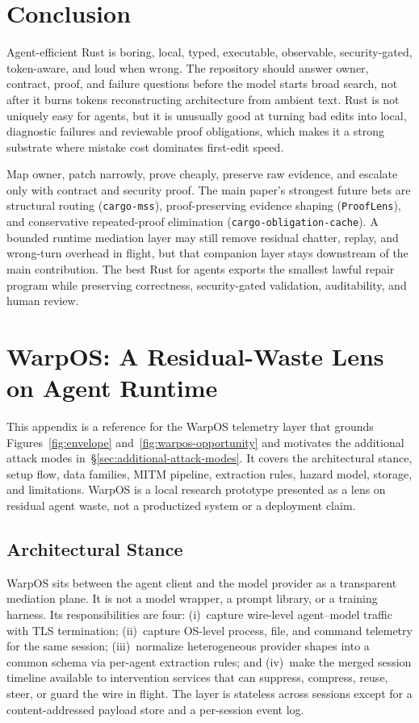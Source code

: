 \documentclass[conference]{IEEEtran}
\begin{document}
\section{Conclusion}
\label{sec:conclusion}
Agent-efficient Rust is boring, local, typed, executable, observable, security-gated, token-aware, and loud when wrong. The repository should answer owner, contract, proof, and failure questions before the model starts broad search, not after it burns tokens reconstructing architecture from ambient text. Rust is not uniquely easy for agents, but it is unusually good at turning bad edits into local, diagnostic failures and reviewable proof obligations, which makes it a strong substrate where mistake cost dominates first-edit speed.

Map owner, patch narrowly, prove cheaply, preserve raw evidence, and escalate only with contract and security proof. The main paper's strongest future bets are structural routing (\texttt{cargo-mss}), proof-preserving evidence shaping (\texttt{ProofLens}), and conservative repeated-proof elimination (\texttt{cargo-obligation-cache}). A bounded runtime mediation layer may still remove residual chatter, replay, and wrong-turn overhead in flight, but that companion layer stays downstream of the main contribution. The best Rust for agents exports the smallest lawful repair program while preserving correctness, security-gated validation, auditability, and human review.

\appendix
\section{WarpOS: A Residual-Waste Lens on Agent Runtime}
\label{app:warpos}
\sloppy

This appendix is a reference for the WarpOS telemetry layer that grounds Figures~\ref{fig:envelope} and~\ref{fig:warpos-opportunity} and motivates the additional attack modes in~\S\ref{sec:additional-attack-modes}. It covers the architectural stance, setup flow, data families, MITM pipeline, extraction rules, hazard model, storage, and limitations. WarpOS is a local research prototype presented as a lens on residual agent waste, not a productized system or a deployment claim.

\subsection{Architectural Stance}
\label{app:warpos-arch}

WarpOS sits between the agent client and the model provider as a transparent mediation plane. It is not a model wrapper, a prompt library, or a training harness. Its responsibilities are four: (i)~capture wire-level agent--model traffic with TLS termination; (ii)~capture OS-level process, file, and command telemetry for the same session; (iii)~normalize heterogeneous provider shapes into a common schema via per-agent extraction rules; and (iv)~make the merged session timeline available to intervention services that can suppress, compress, reuse, steer, or guard the wire in flight. The layer is stateless across sessions except for a content-addressed payload store and a per-session event log.
\end{document}
